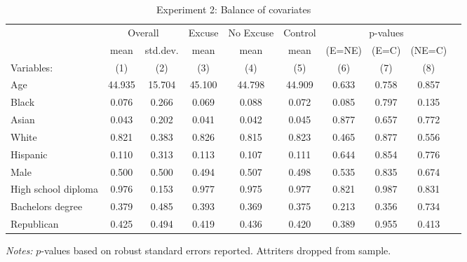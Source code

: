 \begin{table}[!ht]
\centering
\caption{Experiment 2: Balance of covariates}
\label{t:2-balance}
\vspace*{2mm}
\begin{threeparttable}
\begin{tabular}{lccccccccc}
\toprule
 & \multicolumn{2}{c}{Overall} & Excuse & No Excuse & Control & \multicolumn{3}{c}{p-values} \\
 \cmidrule(r){2-3} \cmidrule(lr){4-4} \cmidrule(lr){5-5} \cmidrule(lr){6-6} \cmidrule(lr){7-9} 
 & mean & std.dev. & mean & mean & mean & (E=NE) & (E=C) & (NE=C) \\
 \cmidrule(r){2-2} \cmidrule(lr){3-3} \cmidrule(lr){4-4} \cmidrule(lr){5-5} \cmidrule(l){6-6} \cmidrule(l){7-7} \cmidrule(l){8-8} \cmidrule(l){9-9}  
  Variables: & (1) & (2) & (3) & (4) & (5) & (6) & (7) & (8) \\ \midrule \midrule
Age & 44.935 & 15.704 & 45.100 & 44.798 & 44.909 & 0.633 & 0.758 & 0.857 \\
\addlinespace
Black & 0.076 & 0.266 & 0.069 & 0.088 & 0.072 & 0.085 & 0.797 & 0.135 \\
Asian & 0.043 & 0.202 & 0.041 & 0.042 & 0.045 & 0.877 & 0.657 & 0.772 \\
White & 0.821 & 0.383 & 0.826 & 0.815 & 0.823 & 0.465 & 0.877 & 0.556 \\
Hispanic & 0.110 & 0.313 & 0.113 & 0.107 & 0.111 & 0.644 & 0.854 & 0.776 \\
\addlinespace
Male & 0.500 & 0.500 & 0.494 & 0.507 & 0.498 & 0.535 & 0.835 & 0.674 \\
\addlinespace
High school diploma & 0.976 & 0.153 & 0.977 & 0.975 & 0.977 & 0.821 & 0.987 & 0.831 \\
Bachelors degree & 0.379 & 0.485 & 0.393 & 0.369 & 0.375 & 0.213 & 0.356 & 0.734 \\
\addlinespace
Republican & 0.425 & 0.494 & 0.419 & 0.436 & 0.420 & 0.389 & 0.955 & 0.413 \\
 \midrule
\bottomrule
\end{tabular}
\begin{tablenotes}[flushleft] \footnotesize
\item \textit{Notes: }$p$-values based on robust standard errors reported. Attriters dropped from sample.
\end{tablenotes} \end{threeparttable} \end{table}
